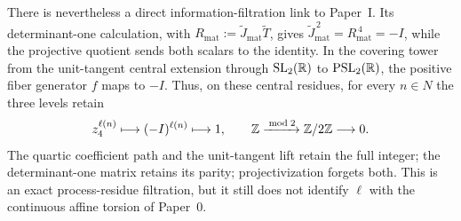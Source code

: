 There is nevertheless a direct information-filtration link to Paper~I.  Its
determinant-one calculation, with
$R_{\mathrm{mat}}:=\widetilde J_{\mathrm{mat}}\widetilde T$, gives
$\widetilde J_{\mathrm{mat}}^{\,2}=R_{\mathrm{mat}}^{\,4}=-I$, while the
projective quotient sends both scalars to the identity.  In the covering tower
from the unit-tangent central extension through
$\operatorname{SL}_2(\mathbb{R})$ to $\operatorname{PSL}_2(\mathbb{R})$, the positive fiber
generator $f$ maps to $-I$.  Thus, on these central residues, for every
$n\in N$ the three levels retain
\begin{equation}
 z_4^{\ell(n)}
 \longmapsto
 (-I)^{\ell(n)}
 \longmapsto
 1,
 \qquad
 \mathbb{Z}\xrightarrow{\bmod 2}\mathbb{Z}/2\mathbb{Z}\longrightarrow0.
 \label{eq:q4-central-residue-information-filtration}
\end{equation}
The quartic coefficient path and the unit-tangent lift retain the full integer;
the determinant-one matrix retains its parity; projectivization forgets both.
This is an exact process-residue filtration, but it still does not identify
$\ell$ with the continuous affine torsion of Paper~0.

